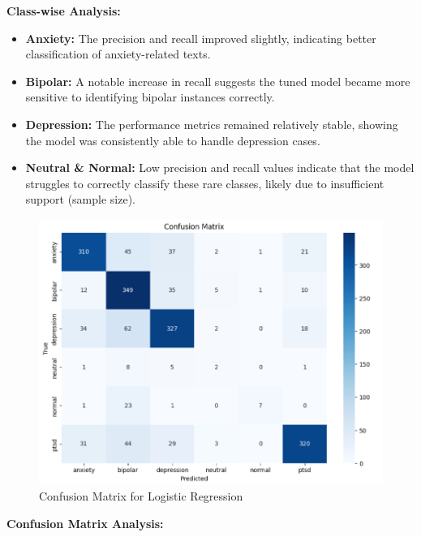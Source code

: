 \textbf{Class-wise Analysis:}

\begin{itemize}
    \item \textbf{Anxiety:} The precision and recall improved slightly, indicating better classification of anxiety-related texts.
    \item \textbf{Bipolar:} A notable increase in recall suggests the tuned model became more sensitive to identifying bipolar instances correctly.
    \item \textbf{Depression:} The performance metrics remained relatively stable, showing the model was consistently able to handle depression cases.
    \item \textbf{Neutral \& Normal:} Low precision and recall values indicate that the model struggles to correctly classify these rare classes, likely due to insufficient support (sample size).
\end{itemize}


\begin{figure}[h!]  
    \centering
    \includegraphics[width=1.0\textwidth]{Images/Confusion Matrix LR.png}  
    \caption{Confusion Matrix for Logistic Regression}
    \label{Project Modules}  %
\end{figure}

\pagebreak
\textbf{Confusion Matrix Analysis:}

